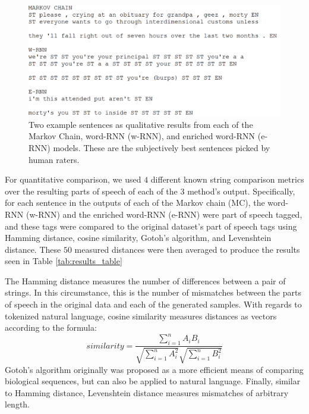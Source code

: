 \documentclass[conference]{IEEEtran}
\begin{document}
\begin{figure}[ht]
\caption{Two example sentences as qualitative results from each of the Markov Chain, word-RNN (w-RNN), and enriched word-RNN (e-RNN) models. These are the subjectively best sentences picked by human raters.}
\label{fig:qual_results}
\centering
\vspace{2mm}
\includegraphics[scale=0.2]{qualitative_examples}
\end{figure}

For quantitative comparison, we used $4$ different known string comparison metrics\cite{cohen2003comparison} over the resulting parts of speech of each of the $3$ method's output.  Specifically, for each sentence in the outputs of each of the Markov chain (MC), the word-RNN (w-RNN) and the enriched word-RNN (e-RNN) were part of speech tagged, and these tags were compared to the original dataset's part of speech tags using Hamming distance\cite{norouzi2012hamming}, cosine similarity\cite{cohen2003comparison}, Gotoh's algorithm\cite{gotoh1982improved}, and Levenshtein distance\cite{yujian2007normalized}.  These $50$ measured distances were then averaged to produce the results seen in Table \ref{tab:results_table}

The Hamming distance measures the number of differences between a pair of strings.  In this circumstance, this is the number of mismatches between the parts of speech in the original data and each of the generated samples. With regards to tokenized natural language, cosine similarity measures distances as vectors according to the formula:
$$similarity = \frac{\sum_{i=1}^{n}A_iB_i}{\sqrt{\sum_{i=1}^{n}A_i^2}\sqrt{\sum_{i=1}^{n}B_i^2}} $$ Gotoh's algorithm originally was proposed as a more efficient means of comparing biological sequences, but can also be applied to natural language.  Finally, similar to Hamming distance, Levenshtein distance measures mismatches of arbitrary length.
\end{document}
